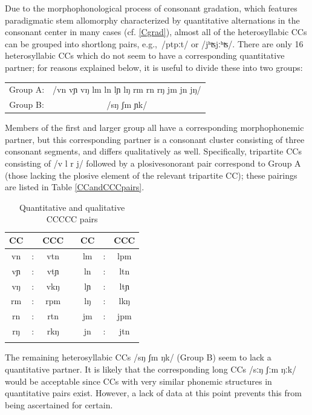 Due to the morphophonological process of consonant gradation, which features paradigmatic stem allomorphy characterized by quantitative alternations in the consonant center in many cases (cf. \SEC\ref{Cgrad}), 
almost all of the heterosyllabic CCs can be grouped into short\TILDE long pairs, e.g.,~/pt\TILDE pːt/ or /jʰʦ\TILDE jːʰʦ/. There are only 16 heterosyllabic CCs which do not seem to have a corresponding quantitative partner; for reasons explained below, it is useful to divide these into two groups: %
\begin{center}
\begin{tabular}{c c}
Group A: & /vn vɲ vŋ lm ln lɲ lŋ rm rn rŋ jm jn jŋ/\\
Group B: & /sŋ ʃm ɲk/ \\
\end{tabular}
\end{center}
Members of the first and larger group all have a corresponding morphophonemic partner, but this corresponding partner is a consonant cluster consisting of three consonant segments, and differs qualitatively as well. Specifically, tripartite CCs consisting of /v l r j/ followed by a plosive\PLUS sonorant pair %
correspond to Group A (those lacking the plosive element of the relevant tripartite CC); these pairings are listed in Table \vref{CCandCCCpairs}. 
\begin{table}[h]\centering
\caption{Quantitative and qualitative CC\TILDE CCC pairs}\label{CCandCCCpairs}
\begin{tabular}{ccc p{30pt} ccc}\mytoprule
CC	&\TILDE & CCC	&&	CC	&\TILDE & CCC\\\hline%
vn	&:& vtn 	&&	lm	&:& lpm \\
vɲ	&:& vtɲ 	&&	ln	&:& ltn \\
vŋ	&:& vkŋ	&&	lɲ	&:& ltɲ \\
rm	&:& rpm	&&	lŋ	&:& lkŋ \\
rn	&:& rtn	&&	jm	&:& jpm \\
rŋ	&:& rkŋ 	&&	jn	&:& jtn \\\mybottomrule%
\end{tabular}
\end{table}
The remaining heterosyllabic CCs /sŋ ʃm ŋk/ (Group B) seem to lack a quantitative partner. It is likely that the corresponding long CCs /sːŋ ʃːm ŋːk/ would be acceptable since CCs with very similar phonemic structures in quantitative pairs exist. However, a lack of data at this point prevents this from being ascertained for certain.

